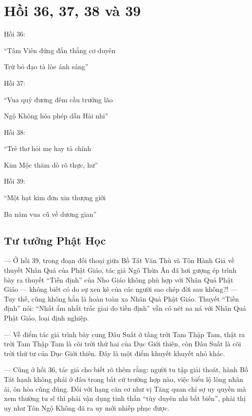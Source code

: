 \chapter{Hồi 36, 37, 38 và 39} %
\label{cha:hoi_36_37}

Hồi 36:

\begin{itshape}
``Tâm Viên đứng đắn thắng cơ duyên

Trừ bỏ đạo tà lòe ánh sáng''
\end{itshape}

Hồi 37:

\begin{itshape}
``Vua quỷ đương đêm cầu trưởng lão

Ngộ Không hóa phép dẫn Hài nhi''
\end{itshape}

Hồi 38:

\begin{itshape}
``Trẻ thơ hỏi mẹ hay tà chính

Kim Mộc thăm dò rõ thực, hư''
\end{itshape}

Hồi 39:

\begin{itshape}
``Một hạt kim đơn xin thượng giới

Ba năm vua cũ về dương gian''
\end{itshape}

\section{Tư tưởng Phật Học} %
\label{sec:36_37_phat_hoc}

— Ở hồi 39, trong đoạn đối thoại giữa Bồ Tát Văn Thù và Tôn Hành Giả về thuyết Nhân Quả của Phật Giáo, tác giả Ngô Thừa Ân đã hơi gượng ép trình bày ra thuyết ``Tiền định'' của Nho Giáo không phù hợp với Nhân Quả Phật Giáo — không biết có do sự xen kẽ của các người sao chép đời sau không?! — Tuy thế, cũng không hẳn là hoàn toàn xa Nhân Quả Phật Giáo. Thuyết ``Tiền định'' nói: ``Nhất ẩm nhất trác giai do tiền định'' vẫn có nét na ná với Nhân Quả Phật Giáo, loại định nghiệp.

— Về điểm tác giả trình bày cung Đâu Suất ở tầng trời Tam Thập Tam, thật ra trời Tam Thập Tam là cõi trời thứ hai của Dục Giới thiên, còn Đâu Suất là cõi trời thứ tư của Dục Giới thiên. Đây là một điểm khuyết khuyết nhỏ khác.

— Cũng ở hồi 36, tác giả cho biết rõ thêm rằng: người tu tập giải thoát, hành Bồ Tát hạnh không phải ở đâu trong bất cứ trường hợp nào, việc biểu lộ lòng nhân ái, ôn hòa cũng đúng. Đối với hạng căn cơ như vị Tăng quan chỉ sợ uy quyền mà xem thường tu sĩ thì phải vận dụng tinh thần ``tùy duyên nhi bất biến'', phải thị uy như Tôn Ngộ Không đã ra uy mới nhiếp phục được.

